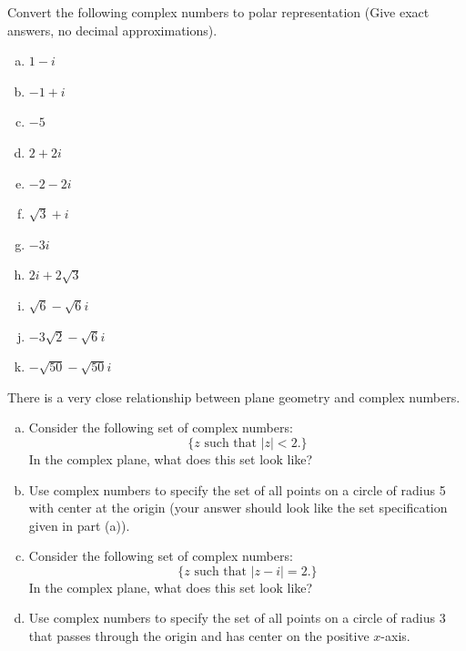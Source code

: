 {\begin{exercise}{21}
\begin{multicols}{2}
\begin{enumerate}[(a)]
\end{enumerate}
\end{multicols}
\end{exercise}

\begin{exercise}{22}
Convert the following complex numbers to polar representation (Give exact answers, no decimal approximations).
\begin{multicols}{3}
\begin{enumerate}[(a)]
 
 \item
$1-i$
\item
$-1 + i$
 \item
$-5$
 \item
$2+2i$
\item
$-2 - 2i$
\item
$\sqrt{3} + i$
 \item
$-3i$
 \item
$2i + 2 \sqrt{3}$
\item
$\sqrt{6} - \sqrt{6}i$
\item
$-3\sqrt{2} - \sqrt{6}i$
\item
$-\sqrt{50} - \sqrt{50}i$
  
\end{enumerate}
\end{multicols}
\end{exercise}

\begin{exercise}{23}
There is a very close relationship between plane geometry and complex numbers.
\begin{enumerate}[(a)]
\item
Consider the following set of complex numbers:
\[ \{z \text{ such that } |z| < 2. \} \]
In the complex plane, what does this set look like?
\item
Use complex numbers to specify the set of all points on a circle of radius 5 with center at the origin (your answer should look like the set specification given in part (a)).
\item
Consider the following set of complex numbers:
\[ \{z \text{ such that } |z-i| = 2. \} \]
In the complex plane, what does this set look like?
\item
Use complex numbers to specify the set of all points on a circle of radius 3 that passes through the origin and has center on the positive $x$-axis.
\end{enumerate}
\end{exercise}

}

